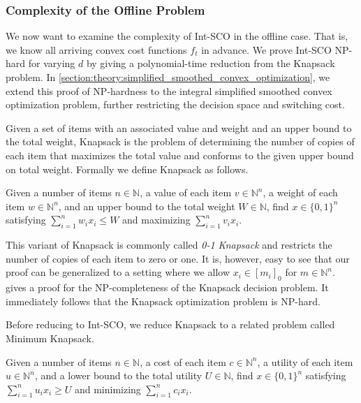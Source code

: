 \subsubsection{Complexity of the Offline Problem}

We now want to examine the complexity of Int-SCO in the offline case. That is, we know all arriving convex cost functions $f_t$ in advance. We prove Int-SCO NP-hard for varying $d$ by giving a polynomial-time reduction from the Knapsack problem. In \cref{section:theory:simplified_smoothed_convex_optimization}, we extend this proof of NP-hardness to the integral simplified smoothed convex optimization problem, further restricting the decision space and switching cost.

Given a set of items with an associated value and weight and an upper bound to the total weight, Knapsack is the problem of determining the number of copies of each item that maximizes the total value and conforms to the given upper bound on total weight. Formally we define Knapsack as follows.

\begin{problem}[Knapsack (KP)]
Given a number of items $n \in \mathbb{N}$, a value of each item $v \in \mathbb{N}^n$, a weight of each item $w \in \mathbb{N}^n$, and an upper bound to the total weight $W \in \mathbb{N}$, find $x \in \{0,1\}^n$ satisfying $\sum_{i = 1}^n w_i x_i \leq W$ and maximizing $\sum_{i=1}^n v_i x_i$.
\end{problem}

This variant of Knapsack is commonly called \emph{0-1 Knapsack} and restricts the number of copies of each item to zero or one. It is, however, easy to see that our proof can be generalized to a setting where we allow $x_i \in [m_i]_0$ for $m \in \mathbb{N}^n$. \citeauthor*{Williamson2014}~\cite{Williamson2014} gives a proof for the NP-completeness of the Knapsack decision problem. It immediately follows that the Knapsack optimization problem is NP-hard.

Before reducing to Int-SCO, we reduce Knapsack to a related problem called Minimum Knapsack.

\begin{problem}
Given a number of items $n \in \mathbb{N}$, a cost of each item $c \in \mathbb{N}^n$, a utility of each item $u \in \mathbb{N}^n$, and a lower bound to the total utility $U \in \mathbb{N}$, find $x \in \{0,1\}^n$ satisfying $\sum_{i = 1}^n u_i x_i \geq U$ and minimizing $\sum_{i=1}^n c_i x_i$.
\end{problem}

